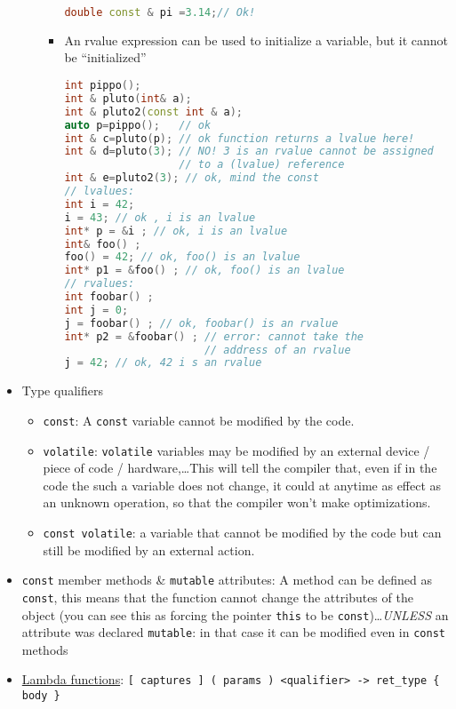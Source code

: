 \documentclass[a4paper,12pt,%
              final%
              ]{article}
\begin{document}
\begin{itemize}
\begin{itemize}
\begin{itemize}
\begin{lstlisting}[language=C++]
double const & pi =3.14;// Ok!
            \end{lstlisting}
          \item An rvalue expression can be used to initialize a variable, but it cannot be “initialized”
            \begin{lstlisting}[language=C++]
int pippo();
int & pluto(int& a);
int & pluto2(const int & a);
auto p=pippo();   // ok
int & c=pluto(p); // ok function returns a lvalue here!
int & d=pluto(3); // NO! 3 is an rvalue cannot be assigned
                  // to a (lvalue) reference
int & e=pluto2(3); // ok, mind the const
// lvalues:
int i = 42;
i = 43; // ok , i is an lvalue
int* p = &i ; // ok, i is an lvalue
int& foo() ;
foo() = 42; // ok, foo() is an lvalue
int* p1 = &foo() ; // ok, foo() is an lvalue
// rvalues:
int foobar() ;
int j = 0;
j = foobar() ; // ok, foobar() is an rvalue
int* p2 = &foobar() ; // error: cannot take the
                      // address of an rvalue
j = 42; // ok, 42 i s an rvalue
            \end{lstlisting}
        \end{itemize}
    \end{itemize}
  \item Type qualifiers
    \begin{itemize}
      \item \texttt{const}: A \texttt{const} variable cannot be modified by the code.
      \item \texttt{volatile}: \texttt{volatile} variables may be modified by an external device / piece of code / hardware,\ldots This will tell the compiler that, even if in the code the such a variable does not change, it could at anytime as effect as an unknown operation, so that the compiler won't make optimizations.
      \item \texttt{const volatile}: a variable that cannot be modified by the code but can still be modified by an external action.
    \end{itemize}
  \item \texttt{const} member methods \& \texttt{mutable} attributes: A method can be defined as \texttt{const}, this means that the function cannot change the attributes of the object (you can see this as forcing the pointer \texttt{this} to be \texttt{const})\ldots \emph{UNLESS} an attribute was declared \texttt{mutable}: in that case it can be modified even in \texttt{const} methods
  \item \href{https://en.cppreference.com/w/cpp/language/lambda}{Lambda functions}: \verb|[ captures ] ( params ) <qualifier> -> ret_type { body }|

\end{itemize}
\end{document}
